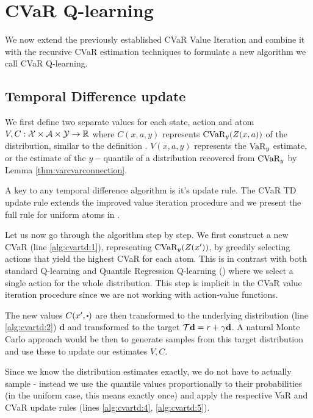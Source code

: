 \section{CVaR Q-learning}\label{sec:qcvar}

We now extend the previously established CVaR Value Iteration and combine it with the recursive CVaR estimation techniques to formulate a new algorithm we call CVaR Q-learning.

\subsection{Temporal Difference update}
We first define two separate values for each state, action and atom $V, C: \mathcal{X}\times\mathcal{A}\times\mathcal{Y}\to\mathbb{R}$ where $C(x, a, y)$ represents $\text{CVaR}_y(Z(x, a))$ of the distribution, similar to the definition . $V(x, a, y)$ represents the $\text{VaR}_y$ estimate, or the estimate of the $y-$quantile of a distribution recovered from $\text{CVaR}_y$ by Lemma \ref{thm:varcvarconnection}.

A key to any temporal difference algorithm is it's update rule. The CVaR TD update rule extends the improved value iteration procedure and we present the full rule for uniform atoms in . 

Let us now go through the algorithm step by step. We first construct a new CVaR (line \ref{alg:cvartd:1}), representing $\text{CVaR}_y(Z(x'))$, by greedily selecting actions that yield the highest CVaR for each atom. This is in contrast with both standard Q-learning and Quantile Regression Q-learning () where we select a single action for the whole distribution.
This step is implicit in the CVaR value iteration procedure since we are not working with action-value functions. 

The new values $C(x', \bigcdot)$ are then transformed to the underlying distribution (line \ref{alg:cvartd:2}) $\mathbf{d}$ and transformed to the target $\mathcal{T} \mathbf{d} = r + \gamma \mathbf{d}$. A natural Monte Carlo approach would be then to generate samples from this target distribution and use these to update our estimates $V, C$.

Since we know the distribution estimates exactly, we do not have to actually sample - instead we use the quantile values proportionally to their probabilities (in the uniform case, this means exactly once) and apply the respective VaR and CVaR update rules (lines \ref{alg:cvartd:4}, \ref{alg:cvartd:5}).


